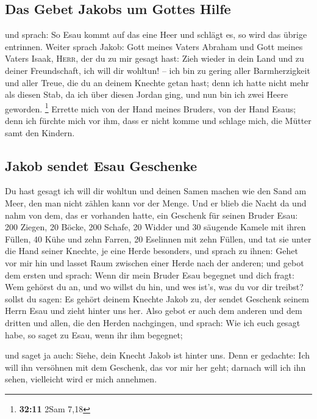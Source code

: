 \hypertarget{das-gebet-jakobs-um-gottes-hilfe}{%
\subsection{Das Gebet Jakobs um Gottes
Hilfe}\label{das-gebet-jakobs-um-gottes-hilfe}}

 und sprach: So Esau kommt auf das eine Heer und schlägt
es, so wird das übrige entrinnen.  Weiter sprach Jakob:
Gott meines Vaters Abraham und Gott meines Vaters Isaak, \textsc{Herr},
der du zu mir gesagt hast: Zieh wieder in dein Land und zu deiner
Freundschaft, ich will dir wohltun! --  ich bin zu gering
aller Barmherzigkeit und aller Treue, die du an deinem Knechte getan
hast; denn ich hatte nicht mehr als diesen Stab, da ich über diesen
Jordan ging, und nun bin ich zwei Heere geworden. \footnote{\textbf{32:11}
  2Sam 7,18}  Errette mich von der Hand meines Bruders,
von der Hand Esaus; denn ich fürchte mich vor ihm, dass er nicht komme
und schlage mich, die Mütter samt den Kindern.

\hypertarget{jakob-sendet-esau-geschenke}{%
\subsection{Jakob sendet Esau
Geschenke}\label{jakob-sendet-esau-geschenke}}

 Du hast gesagt ich will dir wohltun und deinen Samen
machen wie den Sand am Meer, den man nicht zählen kann vor der Menge.
 Und er blieb die Nacht da und nahm von dem, das er
vorhanden hatte, ein Geschenk für seinen Bruder Esau: 
200 Ziegen, 20 Böcke, 200 Schafe, 20 Widder  und 30
säugende Kamele mit ihren Füllen, 40 Kühe und zehn Farren, 20 Eselinnen
mit zehn Füllen,  und tat sie unter die Hand seiner
Knechte, je eine Herde besonders, und sprach zu ihnen: Gehet vor mir hin
und lasset Raum zwischen einer Herde nach der anderen; 
und gebot dem ersten und sprach: Wenn dir mein Bruder Esau begegnet und
dich fragt: Wem gehörst du an, und wo willst du hin, und wes ist's, was
du vor dir treibst?  sollst du sagen: Es gehört deinem
Knechte Jakob zu, der sendet Geschenk seinem Herrn Esau und zieht hinter
uns her.  Also gebot er auch dem anderen und dem dritten
und allen, die den Herden nachgingen, und sprach: Wie ich euch gesagt
habe, so saget zu Esau, wenn ihr ihm begegnet;

 und saget ja auch: Siehe, dein Knecht Jakob ist hinter
uns. Denn er gedachte: Ich will ihn versöhnen mit dem Geschenk, das vor
mir her geht; darnach will ich ihn sehen, vielleicht wird er mich
annehmen.


